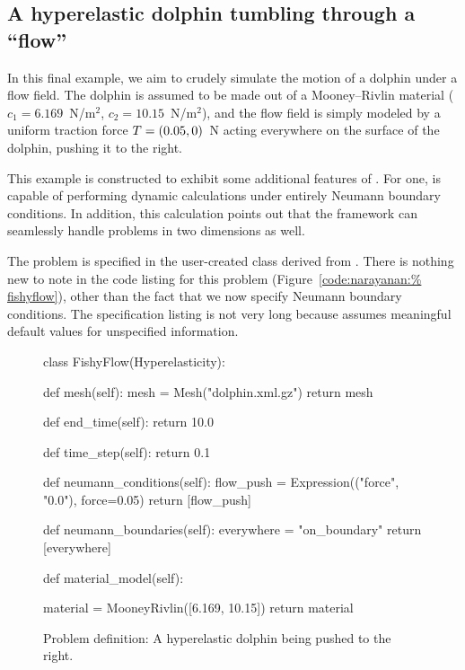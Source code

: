 \subsection{A hyperelastic dolphin tumbling through a ``flow''}

In this final example, we aim to crudely simulate the motion of a
dolphin under a flow field. The dolphin is assumed to be made out of a
Mooney--Rivlin material ($c_{1} = 6.169$~N/m$^2$, $c_{2} =
10.15$~N/m$^2$), and the flow field is simply modeled by a uniform
traction force $\mbox{$ T$} = (0.05, 0)$~N acting everywhere on the surface of
the dolphin, pushing it to the right.

This example is constructed to exhibit some additional features of
\twist. For one, \twist{} is capable of performing dynamic calculations
under entirely Neumann boundary conditions. In addition, this
calculation points out that the framework can seamlessly handle
problems in two dimensions as well.

The problem is specified in the user-created class 
derived from . There is nothing new to note in
the code listing for this problem (Figure~\ref{code:narayanan:%
fishyflow}), other than the fact that we now specify Neumann boundary
conditions. The specification listing is not very long because
\twist{} assumes meaningful default values for unspecified
information.

\begin{figure}
\bwfig
\begin{python}
class FishyFlow(Hyperelasticity):

    def mesh(self):
        mesh = Mesh("dolphin.xml.gz")
        return mesh

    def end_time(self):
        return 10.0

    def time_step(self):
        return 0.1

    def neumann_conditions(self):
        flow_push = Expression(("force", "0.0"), force=0.05)
        return [flow_push]

    def neumann_boundaries(self):
        everywhere = "on_boundary"
        return [everywhere]

    def material_model(self):

        material = MooneyRivlin([6.169, 10.15])
        return material
\end{python}
\caption{Problem definition: A hyperelastic dolphin being pushed to
  the right.}
\label{code:narayanan:fishyflow}
\end{figure}

